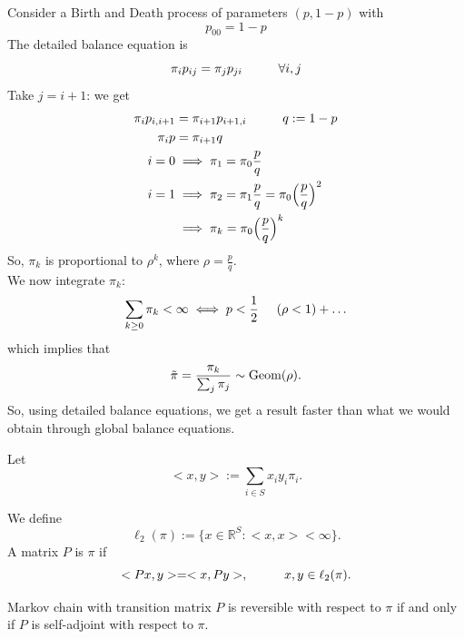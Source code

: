 \documentclass{article}
\begin{document}
\begin{example}
    Consider a Birth and Death process of parameters $(p,1-p)$ with 
    \begin{equation*}
        p_{00} = 1-p
    \end{equation*}
    The detailed balance equation is
    \begin{equation*}
        \pi_i p_{ij} = \pi_j p_{ji}   \hspace{1 cm} \forall i,j
    \end{equation*}
    Take $j=i+1$: we get
    \begin{align*}
        \pi_i p_{i,i+1} &= \pi_{i+1} p_{i+1,i}  \hspace{1 cm} q:=1-p \\
        \pi_i p &= \pi_{i+1} q\\
        i = 0 &\implies \pi_1 = \pi_0 \frac{p}{q}\\
        i = 1 &\implies \pi_2 = \pi_1 \frac{p}{q} = \pi_0 \Big(\frac{p}{q}\Big)^2 \\
        &\implies \pi_k = \pi_0 \Big(\frac{p}{q}\Big)^k
    \end{align*}
    So, $\pi_k$ is proportional to $\rho^k$, where $\rho = \frac{p}{q}$. \\
    We now integrate $\pi_k$:
    \begin{equation*}
        \sum_{k \geq 0} \pi_k < \infty \iff p < \frac{1}{2} \hspace{0.5 cm} (\rho < 1) + \ldots
    \end{equation*}
    which implies that 
    \begin{equation*}
        \Tilde{\pi} = \frac{\pi_k}{\sum_j \pi_j} \sim \text{Geom}(\rho).
    \end{equation*}
    So, using detailed balance equations, we get a result faster than what we would obtain through global balance equations.
\end{example}
Let 
\begin{equation*}
    <x,y>:= \sum_{i \in S} x_i y_i \pi_i.
\end{equation*}
\begin{definition}
    We define 
        \begin{equation*}
            \ell_2(\pi) := \{x \in \mathbb{R}^S: <x,x> < \infty\}.
        \end{equation*}
        A matrix $P$ is  $\pi$ if 
        \begin{equation*}
            <Px,y> = <x, Py>, \hspace{1 cm} x,y \in \ell_2(\pi).
        \end{equation*}
\end{definition}\begin{proposition}
     Markov chain with transition matrix $P$ is reversible with respect to $\pi$ if and only if $P$ is self-adjoint with respect to $\pi$.
\end{proposition}
\end{document}
